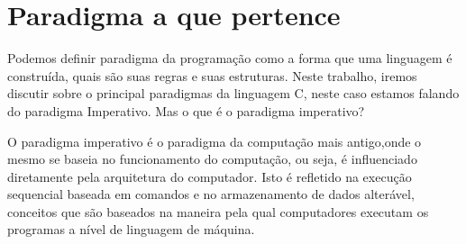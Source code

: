 \chapter{Paradigma a que pertence}

Podemos definir paradigma da programação como a forma que uma linguagem é construída, 
quais são suas regras e suas estruturas. Neste trabalho, iremos discutir sobre o principal 
paradigmas da linguagem C, neste caso estamos falando do paradigma Imperativo. Mas o que é o 
paradigma imperativo?

O paradigma imperativo é o paradigma da computação mais antigo,onde o mesmo se baseia no
funcionamento do computação, ou seja, é influenciado diretamente pela arquitetura do computador.
Isto é refletido na execução sequencial baseada em comandos e no armazenamento de dados alterável,
conceitos que são baseados na maneira pela qual computadores executam os programas a nível de linguagem de máquina.


\newpage